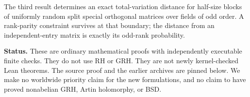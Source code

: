 \documentclass[11pt,letterpaper]{article}
\theoremstyle{definition}\newtheorem{definition}[theorem]{Definition}
\theoremstyle{remark}\newtheorem{remark}[theorem]{Remark}
\begin{document}
The third result determines an exact total-variation distance for half-size blocks of uniformly random split special orthogonal matrices over fields of odd order. A rank-parity constraint survives at that boundary; the distance from an independent-entry matrix is exactly its odd-rank probability.

\textbf{Status.} These are ordinary mathematical proofs with independently executable finite checks. They do not use RH or GRH. They are not newly kernel-checked Lean theorems. The source proof and the earlier archives are pinned below. We make no worldwide priority claim for the new formulations, and no claim to have proved nonabelian GRH, Artin holomorphy, or BSD.

\newpage
\tableofcontents
\newpage






\end{document}
